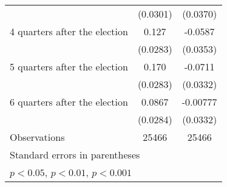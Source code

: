 \begin{table}[htbp]
\begin{tabular}{l*{2}{c}}
                    &    (0.0301)         &    (0.0370)         \\
[1em]
 4 quarters after the election&       0.127\sym{***}&     -0.0587         \\
                    &    (0.0283)         &    (0.0353)         \\
[1em]
 5 quarters after the election&       0.170\sym{***}&     -0.0711\sym{*}  \\
                    &    (0.0283)         &    (0.0332)         \\
[1em]
 6 quarters after the election&      0.0867\sym{**} &    -0.00777         \\
                    &    (0.0284)         &    (0.0332)         \\
\hline
Observations        &       25466         &       25466         \\
\hline\hline
\multicolumn{3}{l}{\footnotesize Standard errors in parentheses}\\
\multicolumn{3}{l}{\footnotesize \sym{*} \(p<0.05\), \sym{**} \(p<0.01\), \sym{***} \(p<0.001\)}\\
\end{tabular}
\end{table}

